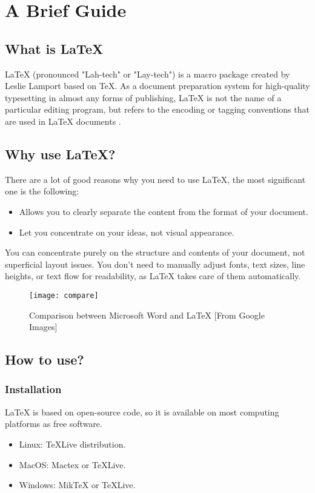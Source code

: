 \chapter{A Brief Guide}
\label{chap:guide}

\section{What is \LaTeX{}} %

\LaTeX{} (pronounced "Lah-tech" or "Lay-tech") is a macro package created by Leslie Lamport based on \TeX{}. As a document preparation system for high-quality typesetting in almost any forms of publishing, \LaTeX{} is not the name of a particular editing program, but refers to the encoding or tagging conventions that are used in \LaTeX{} documents \citep{website:wikipedia,website:latex}.


\section{Why use \LaTeX?}

There are a lot of good reasons why you need to use \LaTeX{}, the most significant one is the following:
\begin{itemize}
    \item Allows you to clearly separate the content from the format of your document.
    \item Let you concentrate on your ideas, not visual appearance.
\end{itemize}

You can concentrate purely on the structure and contents of your document, not superficial layout issues. You don't need to manually adjust fonts, text sizes, line heights, or text flow for readability, as \LaTeX{} takes care of them automatically. \citep{website:wikibook}
\begin{figure}[!htbp]
    \centering
    \texttt{[image: compare]}
    \caption{Comparison between Microsoft Word and \LaTeX{} [From Google Images]}
    \label{fig:compare}
\end{figure}

\section{How to use?} %

\subsection{Installation} %
LaTeX is based on open-source code, so it is available on most computing platforms as free software.
\begin{itemize}
    \item Linux: TeXLive distribution. 
    \item MacOS: Mactex or TeXLive.
    \item Windows: MikTeX or TeXLive. 
\end{itemize}


